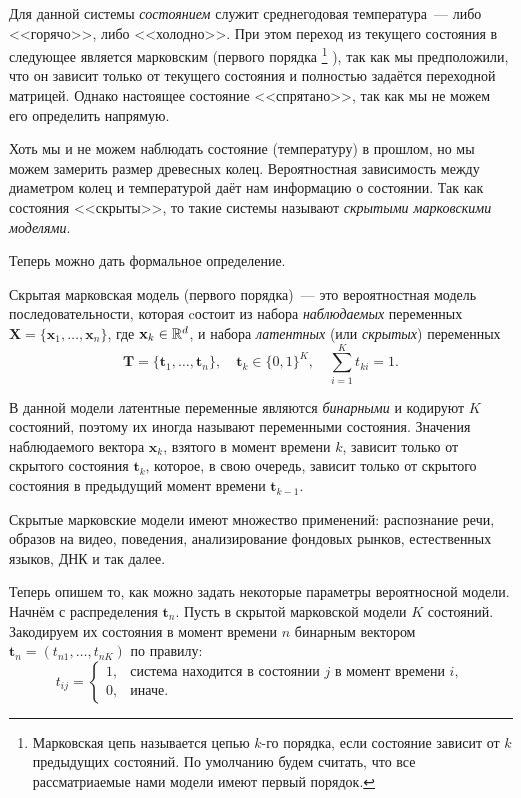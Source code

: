 Для данной системы \emph{состоянием} служит среднегодовая температура~--- либо 
<<горячо>>, либо <<холодно>>. При этом переход из текущего состояния в 
следующее является марковским (первого порядка%
\footnote{Марковская цепь называется цепью \(k\)-го порядка, если состояние 
зависит от \(k\) предыдущих состояний. По умолчанию будем считать, что все 
рассматриаемые нами модели имеют первый порядок.}%
), так как мы предположили, что он зависит только от текущего состояния и 
полностью задаётся переходной матрицей. Однако настоящее состояние 
<<спрятано>>, так как мы не можем его определить напрямую. 

Хоть мы и не можем наблюдать состояние (температуру) в прошлом, но мы можем 
замерить размер древесных колец. Вероятностная зависимость между диаметром 
колец и температурой даёт нам информацию о состоянии. Так как состояния 
<<скрыты>>, то такие системы называют \emph{скрытыми марковскими моделями}.

Теперь можно дать формальное определение.
\begin{definition}
	Скрытая марковская модель (первого порядка)~--- это вероятностная модель 
	последовательности, которая cостоит из набора \emph{наблюдаемых} переменных 
	\(\mathbf{X} = \{\mathbf{x}_{1}, \ldots, \mathbf{x}_{n}\}\), где 
	\(\mathbf{x}_{k} \in \mathbb{R}^{d}\), и набора \emph{латентных} (или 
	\emph{скрытых}) переменных 
	\[
		\mathbf{T} = \{\mathbf{t}_{1}, \ldots, \mathbf{t}_{n}\}, \quad 
		\mathbf{t}_{k} \in \{0, 1\}^{K}, \quad \sum_{i = 1}^{K} t_{ki} = 1.
	\] 
	
	В данной модели латентные переменные являются \emph{бинарными} и кодируют 
	\(K\) состояний, поэтому их иногда называют переменными состояния. Значения 
	наблюдаемого вектора \(\mathbf{x}_{k}\), взятого в момент времени \(k\), 
	зависит только от скрытого состояния \(\mathbf{t}_{k}\), которое, в свою 
	очередь, зависит только от скрытого состояния в предыдущий момент времени 
	\(\mathbf{t}_{k - 1}\).
\end{definition}

Скрытые марковские модели имеют множество применений: распознание речи, образов 
на видео, поведения, анализирование фондовых рынков, естественных языков, ДНК и 
так далее.

Теперь опишем то, как можно задать некоторые параметры вероятносной модели. 
Начнём с распределения \(\mathbf{t}_{n}\). Пусть в скрытой марковской модели 
\(K\) состояний. Закодируем их состояния в момент времени \(n\) бинарным 
вектором \(\mathbf{t}_{n} = (t_{n1}, \ldots, t_{nK})\) по правилу:
\[
	t_{ij} = 
	\begin{cases}
	1, & \text{система находится в состоянии } j \text{ в момент времени } i, \\
	0, & \text{иначе}.
	\end{cases}
\]

